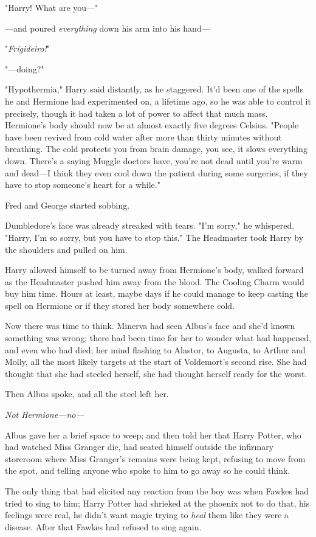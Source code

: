 "Harry! What are you\mbox{---}"

---and poured \emph{everything} down his arm into his hand\mbox{---}

"\emph{Frigideiro!}"

"---doing?"

"Hypothermia," Harry said distantly, as he staggered. It'd been one of the
spells he and Hermione had experimented on, a lifetime ago, so he was able to
control it precisely, though it had taken a lot of power to affect that much
mass. Hermione's body should now be at almost exactly five degrees Celsius.
"People have been revived from cold water after more than thirty minutes
without breathing. The cold protects you from brain damage, you see, it slows
everything down. There's a saying Muggle doctors have, you're not dead until
you're warm and dead---I think they even cool down the patient during some
surgeries, if they have to stop someone's heart for a while."

Fred and George started sobbing.

Dumbledore's face was already streaked with tears. "I'm sorry," he whispered.
"Harry, I'm so sorry, but you have to stop this." The Headmaster took Harry by
the shoulders and pulled on him.

Harry allowed himself to be turned away from Hermione's body, walked forward as
the Headmaster pushed him away from the blood. The Cooling Charm would buy him
time. Hours at least, maybe days if he could manage to keep casting the spell
on Hermione or if they stored her body somewhere cold.

Now there was time to think.
\sbreak
Minerva had seen Albus's face and she'd known something was wrong; there had
been time for her to wonder what had happened, and even who had died; her mind
flashing to Alastor, to Augusta, to Arthur and Molly, all the most likely
targets at the start of Voldemort's second rise. She had thought that she had
steeled herself, she had thought herself ready for the worst.

Then Albus spoke, and all the steel left her.

\emph{Not Hermione---no---}

Albus gave her a brief space to weep; and then told her that Harry Potter, who
had watched Miss Granger die, had seated himself outside the infirmary
storeroom where Miss Granger's remains were being kept, refusing to move from
the spot, and telling anyone who spoke to him to go away so he could think.

The only thing that had elicited any reaction from the boy was when Fawkes had
tried to sing to him; Harry Potter had shrieked at the phoenix not to do that,
his feelings were real, he didn't want magic trying to \emph{heal} them like
they were a disease. After that Fawkes had refused to sing again.

